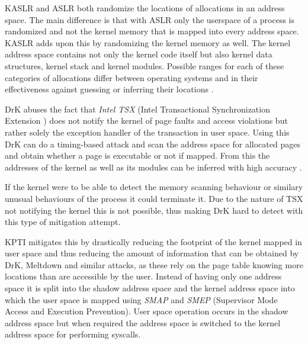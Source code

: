 KASLR and ASLR both randomize the locations of allocations in an address space.
The main difference is that with ASLR only the userspace of a process is randomized and not the kernel memory that is mapped into every address space.
KASLR adds upon this by randomizing the kernel memory as well.
The kernel address space contains not only the kernel code itself but also kernel data structures, kernel stack and kernel modules.
Possible ranges for each of these categories of allocations differ between operating systems and in their effectiveness against guessing or inferring their locations \cite{drk}.

DrK abuses the fact that \textit{Intel TSX} (Intel Transactional Synchronization Extension \cite{intel-tsx-overview}) does not notify the kernel of page faults and access violations but rather solely the exception handler of the transaction in user space.
Using this DrK can do a timing-based attack and scan the address space for allocated pages and obtain whether a page is executable or not if mapped.
From this the addresses of the kernel as well as its modules can be inferred with high accuracy \cite{drk}.

If the kernel were to be able to detect the memory scanning behaviour or similary unusual behaviours of the process it could terminate it.
Due to the nature of TSX not notifying the kernel this is not possible, thus making DrK hard to detect with this type of mitigation attempt.

KPTI mitigates this by drastically reducing the footprint of the kernel mapped in user space and thus reducing the amount of information that can be obtained by DrK, Meltdown and similar attacks, as these rely on the page table knowing more locations than are accessible by the user.
Instead of having only one address space it is split into the shadow address space and the kernel address space into which the user space is mapped using \textit{SMAP} and \textit{SMEP} (Supervisor Mode Access and Execution Prevention).
User space operation occurs in the shadow address space but when required the address space is switched to the kernel address space for performing syscalls.\cite{kaiser}
